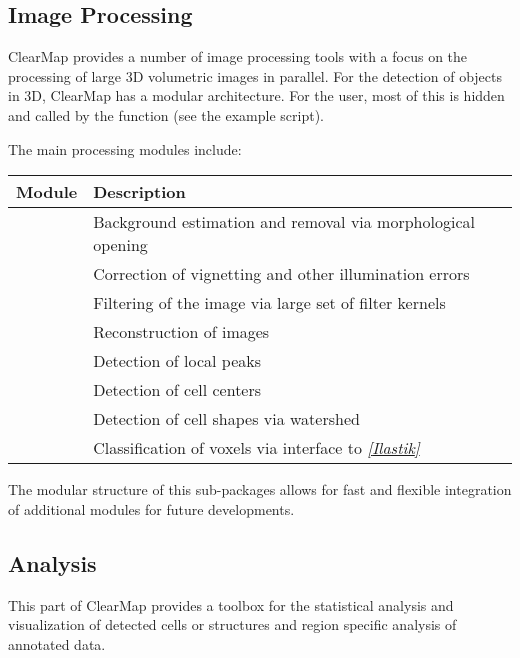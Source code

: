 \documentclass[letterpaper,10pt,english]{sphinxmanual}
\begin{document}
\subsection{Image Processing}
\label{introduction:image-processing}
ClearMap provides a number of image processing tools with a focus on the
processing of large 3D volumetric images in parallel. For the detection of objects in 3D, ClearMap has a modular architecture. For the user, most of this is hidden and called by the  function (see the example script).

The main processing modules include:

\begin{tabulary}{\linewidth}{|L|L|}
\hline
\textsf{\relax 
Module
} & \textsf{\relax 
Description
}\\
\hline
{}
 & 
Background estimation and removal via morphological opening
\\
\hline
{}
 & 
Correction of vignetting and other illumination errors
\\
\hline
{\hyperref[api/ClearMap.ImageProcessing.Filter:module-ClearMap.ImageProcessing.Filter]{\emph{}}}
 & 
Filtering of the image via large set of filter kernels
\\
\hline
{}
 & 
Reconstruction of images
\\
\hline
{}
 & 
Detection of local peaks
\\
\hline
{}
 & 
Detection of cell centers
\\
\hline
{}
 & 
Detection of cell shapes via watershed
\\
\hline
{}
 & 
Classification of voxels via interface to \label{introduction:id4}{\hyperref[introduction:ilastik]{\emph{{[}Ilastik{]}}}}
\\
\hline\end{tabulary}


The modular structure of this sub-packages allows for fast and flexible integration of
additional modules for future developments.


\subsection{Analysis}
\label{introduction:analysis}
This part of ClearMap provides a toolbox for the statistical analysis and
visualization of detected cells or structures and region specific analysis
of annotated data.
\end{document}

